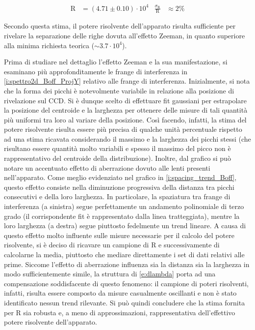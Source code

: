 \documentclass[twocolumn,10pt]{asme2ej}
\begin{document}
\vspace{-15pt}
\begin{align*}
    \text{R} &= (4.71 \pm 0.10)\cdot 10^4  & \frac{\sigma_{\text{R}}}{\text{R}} &\approx 2\%
    \label{e:R_result}
\end{align*}
\vspace{-10pt}

Secondo questa stima, il potere risolvente dell'apparato risulta sufficiente per rivelare la separazione delle righe
dovuta all'effetto Zeeman, in quanto superiore alla minima richiesta teorica ($\sim 3.7 \cdot 10^4$). 

Prima di studiare nel dettaglio l'effetto Zeeman e la sua manifestazione, si esaminano più approfonditamente le frange
di interferenza in \autoref{i:spettro2d_Boff_ProjY} relativo alle frange di interferenza. Inizialmente, si nota che la
forma dei picchi è notevolmente variabile in relazione alla posizione di rivelazione sul CCD. Si è dunque scelto di
effettuare fit gaussiani per estrapolare la posizione del centroide e la larghezza per ottenere delle misure di tali
quantità più uniformi tra loro al variare della posizione. Così facendo, infatti, la stima del potere risolvente risulta
essere più precisa di qualche unità percentuale rispetto ad una stima ricavata considerando il massimo e la larghezza
dei picchi stessi (che risultano essere quantità molto variabili e spesso il massimo del picco non è rappresentativo del
centroide della distribuzione). 
Inoltre, dal grafico si può notare un accentuato effetto di aberrazione dovuto alle lenti presenti nell'apparato. Come
meglio evidenziato nel grafico in \autoref{i:spacing_trend_Boff}, questo effetto consiste nella diminuzione progressiva
della distanza tra picchi consecutivi e della loro larghezza. In particolare, la spaziatura tra frange di interferenza
(a sinistra) segue perfettamente un andamento polinomiale di terzo grado (il corrispondente fit è rappresentato dalla
linea tratteggiata), mentre la loro larghezza (a destra) segue piuttosto fedelmente un trend lineare. A causa di questo
effetto molto influente sulle misure necessarie per il calcolo del potere risolvente, si è deciso di ricavare un
campione di R e successivamente di calcolarne la media, piuttosto che mediare direttamente i set di dati relativi alle
prime. Siccome l'effetto di aberrazione influenza sia la distanza sia la larghezza in modo sufficientemente simile, la
struttura di \autoref{e:dlambda} porta ad una compensazione soddisfacente di questo fenomeno: il campione di poteri
risolventi, infatti, risulta essere composto da misure casualmente oscillanti e non è stato identificato nessun trend
rilevante. Si può quindi concludere che la stima fornita per R sia robusta e, a meno di approssimazioni, rappresentativa
dell'effettivo potere risolvente dell'apparato.
\end{document}
